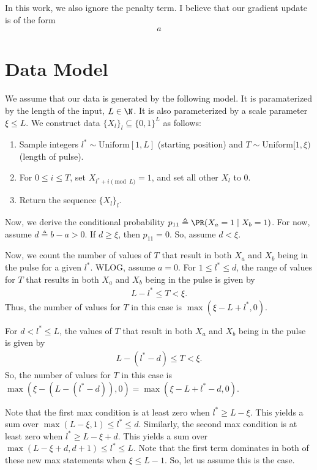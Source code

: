 \documentclass{article}
\begin{document}
In this work, we also ignore the penalty term.
I believe that our gradient update is of the form
\begin{align}
  a
\end{align}


\section{Data Model}
We assume that our data is generated by the following model.
It is paramaterized by the length of the input, $L \in \N$.
It is also parameterized by a scale parameter $\xi \leq L$.
We construct data $\{ X_l \}_l \subseteq \{ 0,1 \}^L$ as follows:
\begin{enumerate}
  \item Sample integers $l^* \sim \text{Uniform}[1, L]$ (starting position) and $T \sim \text{Uniform}[1, \xi)$ (length of pulse).
  \item For $0 \leq i \leq T$, set $X_{l^* + i \pmod{L}} = 1$, and set all other $X_l$ to $0$.
  \item Return the sequence $\{ X_l \}_l$.
\end{enumerate}
Now, we derive the conditional probability $p_{11} \triangleq \PR( X_a = 1 \mid X_b = 1 )$.
For now, assume $d \triangleq b - a > 0$.
If $d \geq \xi$, then $p_{11} = 0$.
So, assume $d < \xi$.

Now, we count the number of values of $T$ that result in both $X_a$ and $X_b$ being in the pulse for a given $l^*$.
WLOG, assume $a = 0$.
For $1 \leq l^* \leq d$, the range of values for $T$ that results in both $X_a$ and $X_b$ being in the pulse is given by
\begin{align}
  L - l^* \leq T < \xi. \label{eq:case1_Trange}
\end{align}
Thus, the number of values for $T$ in this case is $\max( \xi - L + l^* , 0 )$.

For $d < l^* \leq L$, the values of $T$ that result in both $X_a$ and $X_b$ being in the pulse is given by
\begin{align}
  L - (l^* - d) \leq T < \xi. \label{eq:case2_Trange}
\end{align}
So, the number of values for $T$ in this case is $\max(\xi - (L - (l^* - d)), 0) = \max(\xi - L + l^* - d, 0)$.

Note that the first max condition is at least zero when $l^* \geq L - \xi$.
This yields a sum over $\max(L - \xi, 1) \leq l^* \leq d$.
Similarly, the second max condition is at least zero when $l^* \geq L - \xi + d$.
This yields a sum over $\max( L - \xi + d, d+1) \leq l^* \leq L$.
Note that the first term dominates in both of these new max statements when $\xi \leq L-1$.
So, let us assume this is the case.
\end{document}
